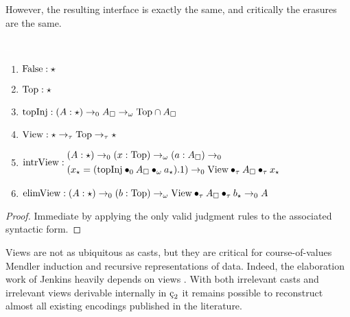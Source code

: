 However, the resulting interface is exactly the same, and critically the erasures are the same.
\begin{theorem}
    \label{lem:2:view_derivations}
    \textcolor{white}{\_}
    \begin{enumerate}
        \item $\textnormal{False} : \star$
        \item $\textnormal{Top} : \star$
        \item $\textnormal{topInj} : (A:\star) \to_0 A_\square \to_\omega \textnormal{Top} \cap A_\square$
        \item $\textnormal{View} : \star \to_\tau \textnormal{Top} \to_\tau \star$
        \item {
            $
                \textnormal{intrView} : 
                \begin{aligned}
                    &(A:\star) \to_0 (x:\textnormal{Top}) \to_\omega (a:A_\square) \to_0
                        \\ &(x_\star = (\textnormal{topInj} \bullet_{0} A_\square \bullet_{\omega} a_\star).1) \to_0 \textnormal{View} \bullet_{\tau} A_\square \bullet_{\tau} x_\star
                \end{aligned}
            $
        }
        \item $\textnormal{elimView} : (A:\star) \to_0 (b:\textnormal{Top}) \to_\omega \textnormal{View} \bullet_{\tau} A_\square \bullet_{\tau} b_\star \to_0 A$
    \end{enumerate}
\end{theorem}
\begin{proof}
    Immediate by applying the only valid judgment rules to the associated syntactic form.
\end{proof}
Views are not as ubiquitous as casts, but they are critical for course-of-values Mendler induction and recursive representations of data.
Indeed, the elaboration work of Jenkins heavily depends on views \cite{jenkins2023elaborating}.
With both irrelevant casts and irrelevant views derivable internally in $\ced$ it remains possible to reconstruct almost all existing encodings published in the literature.
